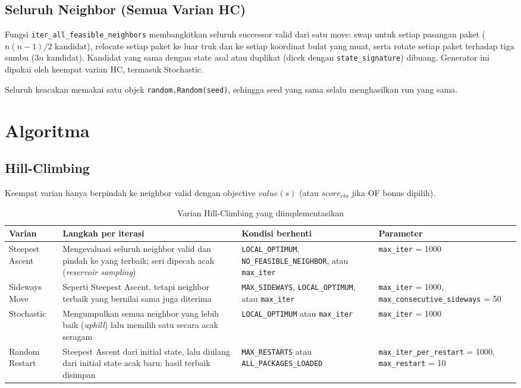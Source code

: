 \documentclass[12pt,a4paper]{report}
\newcommand{\hd}[1]{\cellcolor{hdr}\textbf{#1}}
\newcommand{\code}[1]{\texttt{\small #1}}
\begin{document}
\subsection{Seluruh Neighbor (Semua Varian HC)}
Fungsi \code{iter\_all\_feasible\_neighbors} membangkitkan seluruh successor valid dari satu move:
swap untuk setiap pasangan paket ($n(n-1)/2$ kandidat), relocate setiap paket ke luar truk dan ke
setiap koordinat bulat yang muat, serta rotate setiap paket terhadap tiga sumbu ($3n$ kandidat).
Kandidat yang sama dengan state asal atau duplikat (dicek dengan \code{state\_signature})
dibuang. Generator ini dipakai oleh keempat varian HC, termasuk Stochastic.

Seluruh keacakan memakai satu objek \code{random.Random(seed)}, sehingga seed yang sama selalu
menghasilkan run yang sama.

\section{Algoritma}
\subsection{Hill-Climbing}
Keempat varian hanya berpindah ke neighbor valid dengan objective $value(s)$ (atau
$score_{eta}$ jika OF bonus dipilih).

\begin{table}[H]
\centering
\caption{Varian Hill-Climbing yang diimplementasikan}\label{tab:hcimpl}
\small
\begin{tabular}{|L{2.2cm}|L{4.4cm}|L{3.2cm}|L{3.4cm}|}
\hline
\hd{Varian} & \hd{Langkah per iterasi} & \hd{Kondisi berhenti} & \hd{Parameter} \\ \hline
Steepest Ascent & Mengevaluasi seluruh neighbor valid dan pindah ke yang terbaik; seri dipecah acak (\textit{reservoir sampling}) & \code{LOCAL\_OPTIMUM}, \code{NO\_FEASIBLE\_\allowbreak NEIGHBOR}, atau \code{max\_iter} & \code{max\_iter} = 1000 \\ \hline
Sideways Move & Seperti Steepest Ascent, tetapi neighbor terbaik yang bernilai sama juga diterima & \code{MAX\_SIDEWAYS}, \code{LOCAL\_OPTIMUM}, atau \code{max\_iter} & \code{max\_iter} = 1000, \code{max\_consecutive\_\allowbreak sideways} = 50 \\ \hline
Stochastic & Mengumpulkan semua neighbor yang lebih baik (\textit{uphill}) lalu memilih satu secara acak seragam & \code{LOCAL\_OPTIMUM} atau \code{max\_iter} & \code{max\_iter} = 1000 \\ \hline
Random Restart & Steepest Ascent dari initial state, lalu diulang dari initial state acak baru; hasil terbaik disimpan & \code{MAX\_RESTARTS} atau \code{ALL\_PACKAGES\_\allowbreak LOADED} & \code{max\_iter\_\allowbreak per\_\allowbreak restart} = 1000, \code{max\_restart} = 10 \\ \hline
\end{tabular}
\end{table}
\end{document}
